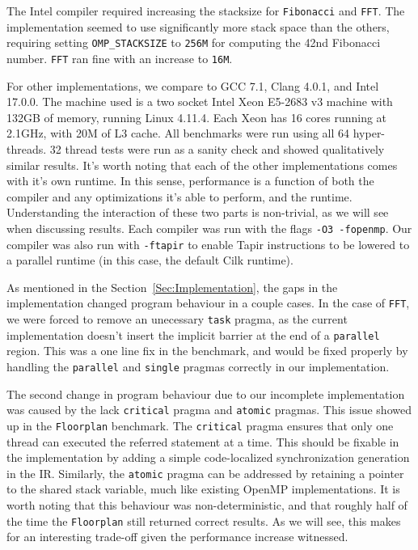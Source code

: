 \documentclass[sigconf]{acmart}
\begin{document}
The Intel compiler required increasing the stacksize for \texttt{Fibonacci} and
\texttt{FFT}. The implementation seemed to use significantly more stack space
than the others, requiring setting \texttt{OMP\_STACKSIZE} to \texttt{256M} for
computing the 42nd Fibonacci number. \texttt{FFT} ran fine with an increase to
\texttt{16M}.  

For other implementations, we compare to GCC 7.1, Clang 4.0.1, and Intel
17.0.0. The machine used is a two socket Intel Xeon E5-2683 v3 machine with
132GB of memory, running Linux 4.11.4. Each Xeon has 16 cores running at
2.1GHz, with 20M of L3 cache. All benchmarks were run using all 64
hyper-threads. 32 thread tests were run as a sanity check and showed
qualitatively similar results. It's worth noting that each of the other
implementations comes with it's own runtime. In this sense, performance is a
function of both the compiler and any optimizations it's able to perform, and
the runtime.  Understanding the interaction of these two parts is non-trivial,
as we will see when discussing results. Each compiler was run with the flags
\texttt{-O3 -fopenmp}. Our compiler was also run with \texttt{-ftapir} to
enable Tapir instructions to be lowered to a parallel runtime (in this case,
the default Cilk runtime).

As mentioned in the Section~\ref{Sec:Implementation}, the gaps in the implementation
changed program behaviour in a couple cases. In the case of \texttt{FFT}, we were
forced to remove an unecessary \texttt{task} pragma, as the current implementation
doesn't insert the implicit barrier at the end of a \texttt{parallel} region. This 
was a one line fix in the benchmark, and would be fixed properly by handling
the \texttt{parallel} and \texttt{single} pragmas correctly in our implementation. 

The second change in program behaviour due to our incomplete implementation was
caused by the lack \texttt{critical} pragma and \texttt{atomic} pragmas. This
issue showed up in the \texttt{Floorplan} benchmark. The \texttt{critical} pragma
ensures that only one thread can executed the referred statement at a time. 
This should be fixable in the implementation by adding a simple code-localized
synchronization generation in the IR. Similarly, the \texttt{atomic} pragma 
can be addressed by retaining a pointer to the shared stack variable, much like
existing OpenMP implementations. It is worth noting that this behaviour was
non-deterministic, and that roughly half of the time the \texttt{Floorplan}
still returned correct results. As we will see, this makes for an interesting
trade-off given the performance increase witnessed.
\end{document}
